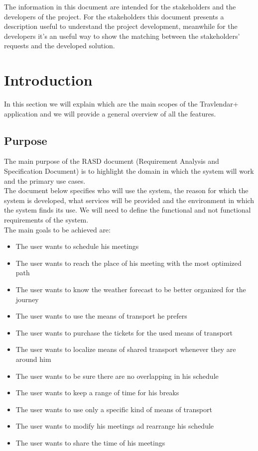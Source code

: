 \documentclass[numbers=noenddot, 12pt, a4paper, oneside]{scrbook}
\begin{document}
The information in this document are intended for the stakeholders and the developers of the project. For the stakeholders this document presents a description useful to understand the project development, meanwhile for the developers it’s an useful way to show the matching between the stakeholders’ requests and the developed solution.

\newpage

\chapter{Introduction}

In this section we will explain which are the main scopes of the Travlendar+ application and we will provide a general overview of all the features.

\section{Purpose}

The main purpose of the RASD document (Requirement Analysis and Specification Document) is to highlight the domain in which the system will work and the primary use cases.\\

The document below specifies who will use the system, the reason for which the system is developed, what services will be provided and the environment in which the system finds its use.
We will need to define the functional and not functional requirements of the system. \\

The main goals to be achieved are:
\begin{itemize}
	\item The user wants to schedule his meetings
	\item The user wants to reach the place of his meeting with the most optimized path
	\item The user wants to know the weather forecast to be better organized for the journey
	\item The user wants to use the means of transport he prefers
	\item The user wants to purchase the tickets for the used means of transport 
	\item The user wants to localize means of shared transport whenever they are around him
	\item The user wants to be sure there are no overlapping in his schedule
	\item The user wants to keep a range of time for his breaks
	\item The user wants to use only a specific kind of means of transport
	\item The user wants to modify his meetings ad rearrange his schedule 
	\item The user wants to share the time of his meetings
\end{itemize}
\end{document}
